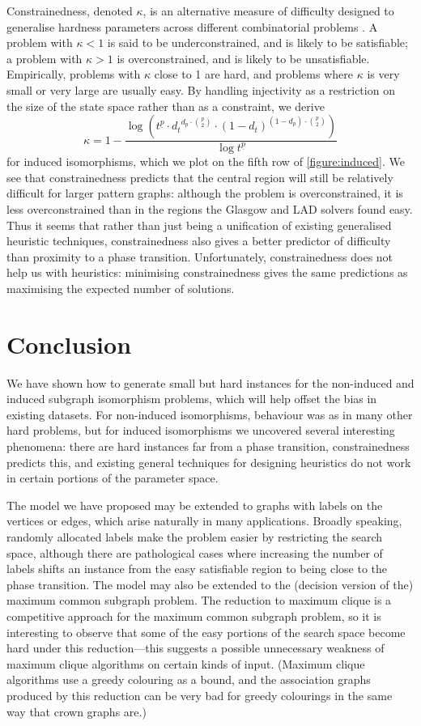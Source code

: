 \documentclass[letterpaper]{article}
\newcommand{\citep}[1]{\cite{#1}}
\begin{document}
Constrainedness, denoted $\kappa$, is an alternative measure of difficulty designed to generalise
hardness parameters across different combinatorial problems \citep{Gent:1996:Kappa}. A problem with
$\kappa < 1$ is said to be underconstrained, and is likely to be satisfiable; a problem with $\kappa
> 1$ is overconstrained, and is likely to be unsatisfiable. Empirically, problems with $\kappa$
close to 1 are hard, and problems where $\kappa$ is very small or very large are usually easy. By
handling injectivity as a restriction on the size of the state space rather than as a constraint, we
derive \[ \kappa = 1 - \frac{\log \left( t^{\underline{p}} \cdot {d_t}^{d_p \cdot \binom{p}{2}} \cdot {(1 -
d_{t})}^{(1 - d_{p}) \cdot \binom{p}{2}} \right)}{\log t^{\underline{p}}}\] for induced isomorphisms, which
we plot on the fifth row of \cref{figure:induced}. We see that constrainedness predicts that the
central region will still be relatively difficult for larger pattern graphs: although the problem is
overconstrained, it is less overconstrained than in the regions the Glasgow and LAD solvers found easy.
Thus it seems that rather than just being a unification of existing generalised heuristic
techniques, constrainedness also gives a better predictor of difficulty than proximity to a phase
transition.  Unfortunately, constrainedness does not help us with heuristics: minimising
constrainedness gives the same predictions as maximising the expected number of solutions.

\section{Conclusion}

We have shown how to generate small but hard instances for the non-induced and induced subgraph
isomorphism problems, which will help offset the bias in existing datasets. For non-induced
isomorphisms, behaviour was as in many other hard problems, but for induced isomorphisms we
uncovered several interesting phenomena: there are hard instances far from a phase transition,
constrainedness predicts this, and existing general techniques for designing heuristics do not work
in certain portions of the parameter space.

The model we have proposed may be extended to graphs with labels on the vertices or edges, which
arise naturally in many applications. Broadly speaking, randomly allocated labels make the problem
easier by restricting the search space, although there are pathological cases where increasing the
number of labels shifts an instance from the easy satisfiable region to being close to the phase
transition. The model may also be extended to the (decision version of the) maximum common subgraph
problem. The reduction to maximum clique is a competitive approach for the maximum common subgraph
problem, so it is interesting to observe that some of the easy portions of the search space become
hard under this reduction---this suggests a possible unnecessary weakness of maximum clique
algorithms on certain kinds of input. (Maximum clique algorithms use a greedy colouring as a bound,
and the association graphs produced by this reduction can be very bad for greedy colourings in the
same way that crown graphs are.)
\end{document}
